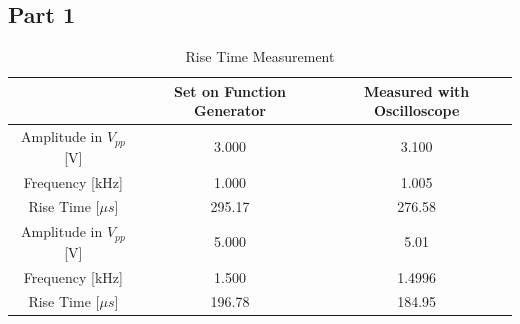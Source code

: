 \documentclass[12pt]{article}
\begin{document}
\subsection{Part 1}
\begin{table}[H]
\centering
\begin{tabular}{|c|c|c|}
\hline
                & Set on Function Generator & Measured with Oscilloscope \\ \hline
Amplitude in $V_{pp}$ [V]   & 3.000                     & 3.100                      \\ \hline
Frequency [kHz] & 1.000                     & 1.005                      \\ \hline
Rise Time [$\mu s$]      & 295.17                    & 276.58                     \\ \hline
Amplitude in $V_{pp}$ [V]    & 5.000                     & 5.01                       \\ \hline
Frequency [kHz] & 1.500                     & 1.4996                     \\ \hline
Rise Time [$\mu s$]      & 196.78                    & 184.95                     \\ \hline
\end{tabular}
\caption{Rise Time Measurement}
\end{table}
\end{document}
